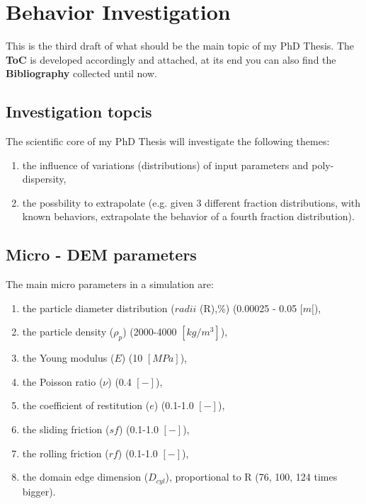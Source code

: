 
\section{Behavior Investigation}
\label{section:behaviorinvestigation}

This is the third draft of what should be the main topic of my PhD Thesis. The \textbf{ToC} is developed accordingly and attached, at its end you can also find the \textbf{Bibliography} collected until now.

\subsection{Investigation topcis}
\label{subsection:investigationtopics}

The scientific core of my PhD Thesis will investigate the following themes:
\begin{enumerate}
\item{the influence of variations (distributions) of input parameters and poly-dispersity,}
\item{the possbility to extrapolate (e.g. given 3 different fraction distributions, with known behaviors, extrapolate the behavior of a fourth fraction distribution).}
\end{enumerate}


\subsection{Micro - DEM parameters}
\label{subsection:microparameters}

The main micro parameters in a simulation are:

\begin{enumerate}[label=(\Alph*)]
\item{the particle diameter distribution ($radii$ (R),\%) (0.00025 - 0.05 $[m[$),}
\item{the particle density ($\rho_p$) (2000-4000 $[kg/m^3]$),}
\item{the Young modulus ($E$) (10 $[MPa]$),}
\item{the Poisson ratio ($\nu$) (0.4 $[-]$),}
\item{the coefficient of restitution ($e$) (0.1-1.0 $[-]$),}
\item{the sliding friction ($sf$) (0.1-1.0 $[-]$),}
\item{the rolling friction ($rf$) (0.1-1.0 $[-]$),}
\item{the domain edge dimension ($D_{cyl}$), proportional to R (76, 100, 124 times bigger).}
\end{enumerate}

